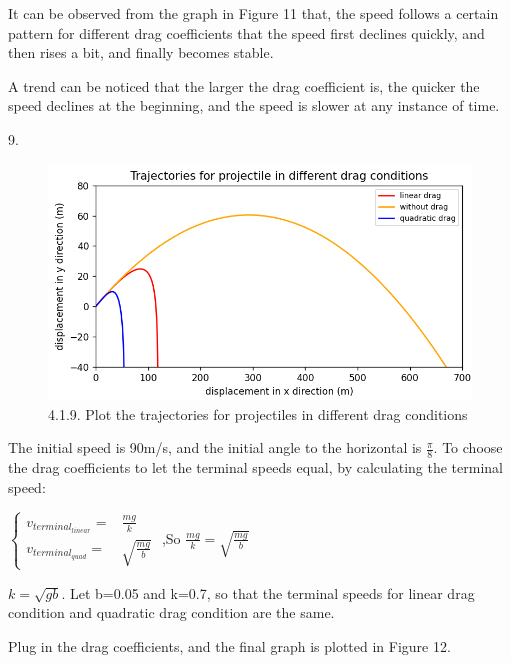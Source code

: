 \documentclass{book}
\begin{document}
It can be observed from the graph in Figure 11 that, the speed follows a certain pattern for different drag coefficients that the speed first declines quickly, and then rises a bit, and finally becomes stable.

A trend can be noticed that the larger the drag coefficient is, the quicker the speed declines at the beginning, and the speed is slower at any instance of time.

\vspace{0.02\textheight}
{\Large 9.}
\begin{figure}[H]
  \centering
  \includegraphics[scale=0.4]{./graphs/project4.1.9.png}
  \caption{4.1.9. Plot the trajectories for projectiles in different drag conditions}
\end{figure}
The initial speed is 90m/s, and the initial angle to the horizontal is {$\frac{\pi}{8}$}.
To choose the drag coefficients to let the terminal speeds equal, by calculating the terminal speed:

\quad$
  \begin{cases}
    v_{terminal_{linear}}= & \frac{mg}{k}        \\

    v_{terminal_{quad}}=   & \sqrt{\frac{mg}{b}}
  \end{cases}
$
\quad ,\quad So $\frac{mg}{k}=\sqrt{\frac{mg}{b}}$

$k=\sqrt{gb}$. Let b=0.05 and k=0.7, so that the terminal speeds for linear drag condition and quadratic drag condition are the same.

Plug in the drag coefficients, and the final graph is plotted in Figure 12.
\end{document}
